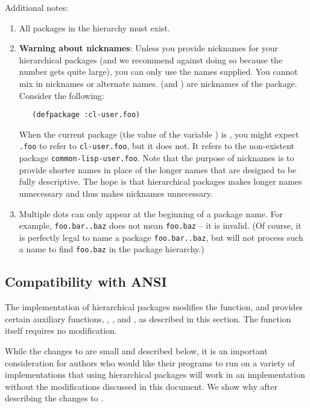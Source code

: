 Additional notes:

\begin{enumerate}
\item
All packages in the hierarchy must exist.

\item
\textbf{Warning about nicknames}: Unless you provide nicknames for
your hierarchical packages (and we recommend against doing so because
the number gets quite large), you can only use the names supplied. You
cannot mix in nicknames or alternate names.  (and
) are nicknames of the  package.
Consider the following:

\begin{verbatim}
   (defpackage :cl-user.foo)
\end{verbatim}
  
When the current package (the value of the variable )
is , you might expect \verb|.foo| to refer to
\verb|cl-user.foo|, but it does not. It refers to the non-existent
package \verb|common-lisp-user.foo|. Note that the purpose of
nicknames is to provide shorter names in place of the longer names
that are designed to be fully descriptive. The hope is that
hierarchical packages makes longer names unnecessary and thus makes
nicknames unnecessary.

\item
Multiple dots can only appear at the beginning of a package name. For
example, \verb|foo.bar..baz| does not mean \verb|foo.baz| -- it is
invalid. (Of course, it is perfectly legal to name a package
\verb|foo.bar..baz|, but  will not process such
a name to find \verb|foo.baz| in the package hierarchy.)
\end{enumerate}


\subsection{Compatibility with ANSI \clisp{}}

The implementation of hierarchical packages modifies the
 function, and provides certain auxiliary
functions, , , and
, as described in this section.
The function  itself requires no modification.

While the changes to  are small and described
below, it is an important consideration for authors who would like
their programs to run on a variety of implementations that using
hierarchical packages will work in an implementation without the
modifications discussed in this document. We show why after
describing the changes to .


